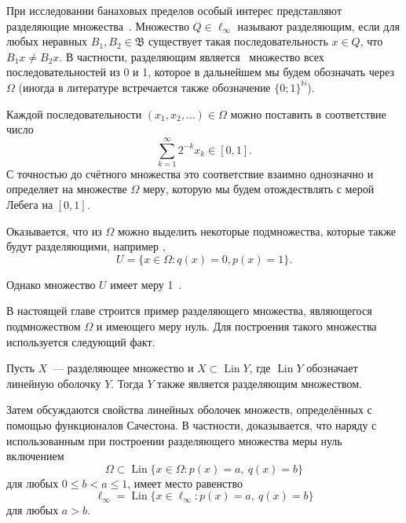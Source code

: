 
При исследовании банаховых пределов особый интерес представляют разделяющие множества~\cite[\S 3]{Semenov2014geomprops}.
Множество $Q\in\ell_\infty$ называют разделяющим, если
для любых неравных $B_1, B_2\in\mathfrak{B}$ существует такая последовательность $x\in Q$,
что $B_1 x \neq B_2 x$.
В частности, разделяющим является~\cite{semenov2010characteristic} множество всех последовательностей из 0 и 1,
которое в дальнейшем мы будем обозначать через $\Omega$
(иногда в литературе встречается также обозначение $\{0;1\}^\mathbb{N}$).

Каждой последовательности $(x_1, x_2, \dots)\in \Omega$ можно поставить в соответствие число
\begin{equation}\label{eq:bijection_omega_0_1}
	\sum_{k=1}^\infty 2^{-k} x_k \in [0,1]
	.
\end{equation}
С точностью до счётного множества это соответствие взаимно однозначно и определяет на множестве $\Omega$ меру,
которую мы будем отождествлять с мерой Лебега на $[0,1]$.

Оказывается, что из $\Omega$ можно выделить некоторые подмножества, которые также будут разделяющими,
например \cite[\S 3, Теорема 11]{Semenov2014geomprops},
\begin{equation}
	U = \{ x\in\Omega: q(x) = 0, p(x) = 1 \}
	.
\end{equation}

Однако множество $U$ имеет меру 1~\cite{semenov2010characteristic}.

В настоящей главе строится пример разделяющего множества,
являющегося подмножеством $\Omega$ и имеющего меру нуль.
Для построения такого множества используется следующий факт.

\begin{lemma}
	Пусть $X$~--- разделяющее множество и $X \subset \operatorname{Lin} Y$,
	где $\operatorname{Lin} Y$ обозначает линейную оболочку $Y$.
	Тогда $Y$ также является разделяющим множеством.
\end{lemma}

Затем обсуждаются свойства линейных оболочек множеств, определённых с помощью функционалов Сачестона.
В частности, доказывается,
что наряду с использованным при построении разделяющего множества меры нуль включением
\begin{equation}
	\Omega \subset \operatorname{Lin}\{x\in\Omega : p(x) = a,~ q(x) = b\}
\end{equation}
для любых $0\leq b < a \leq 1$,
имеет место равенство
\begin{equation}
	\ell_\infty = \operatorname{Lin}\{x\in\ell_\infty : p(x) = a,~ q(x) = b\}
\end{equation}
для любых $a>b$.


